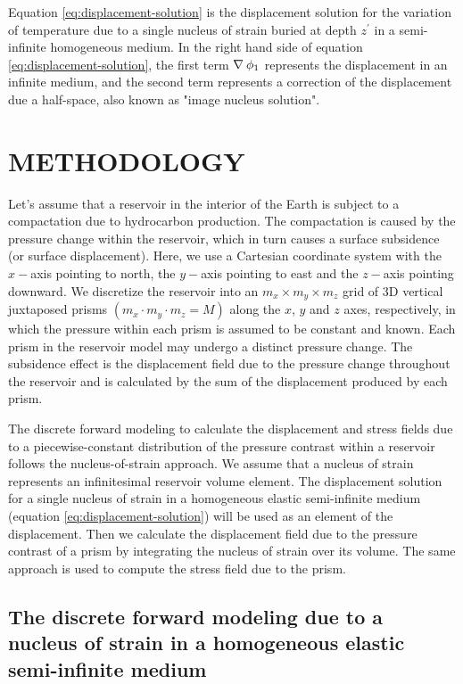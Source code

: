 \documentclass[journal abbreviation, manuscript]{copernicus}
\begin{document}
Equation \ref{eq:displacement-solution} is the displacement solution for the variation of temperature due to a single nucleus of strain buried at depth $z^{\prime}$ in a
semi-infinite homogeneous medium. 
In the right hand side of equation \ref{eq:displacement-solution}, the first term 
$ {\bf{\nabla}} \: \phi_{1} $ represents the displacement in an infinite medium, and the second term represents a correction of the displacement due a half-space, also known as "image nucleus solution".

\section{METHODOLOGY}

Let's assume that a reservoir in the interior of the Earth is subject to a compactation due to hydrocarbon production. 
The compactation is caused by the pressure change within the reservoir, which in turn causes  a surface subsidence (or surface displacement). 
Here, we use a Cartesian coordinate system with the $x-$axis pointing to north, the $y-$axis pointing to east and the $z-$axis pointing downward.
We discretize the reservoir into an $ m_{x} \times m_{y} \times m_{z} $ grid of 3D vertical juxtaposed prisms $(m_{x} \cdot m_{y} \cdot m_{z} = M)$ along the 
$x$, $y$ and $z$ axes, respectively, in which the pressure within each prism is 
assumed to be constant and known. 
Each prism in the reservoir model may undergo a distinct pressure change.
The subsidence effect is the displacement field due to the pressure change throughout the reservoir and is calculated by the sum of the displacement produced by each prism.


The discrete forward modeling to calculate the displacement and stress fields due to a piecewise-constant distribution of the pressure contrast within a reservoir follows the nucleus-of-strain approach. 
We assume that a nucleus of strain represents an infinitesimal reservoir volume 
element. The displacement solution for a single nucleus of strain in a homogeneous elastic semi-infinite medium (equation \ref{eq:displacement-solution}) will be used as an element of the displacement.
Then we calculate the displacement field due to the pressure contrast of a prism by integrating the nucleus of strain over its volume. The same approach is used to 
compute the stress field due to the prism.


\subsection{The discrete forward modeling due to a nucleus of strain in a homogeneous elastic semi-infinite medium}\label{solution-nucleus}
\end{document}
